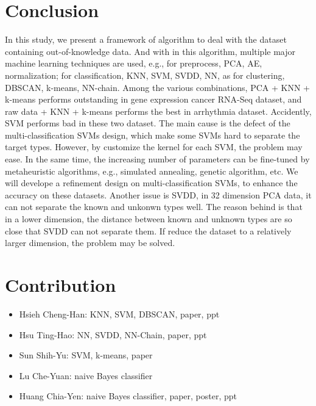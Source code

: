 \documentclass[twocolumn,10pt]{article}
\begin{document}
\section{Conclusion}
In this study, we present a framework of algorithm to deal with the dataset containing 
out-of-knowledge data. And with in this algorithm, multiple major machine learning 
techniques are used, e.g., for preprocess, PCA, AE, normalization; for classification, 
KNN, SVM, SVDD, NN, as for clustering, DBSCAN, k-means, NN-chain. Among the various 
combinations, PCA + KNN + k-means performs outstanding in gene expression cancer RNA-Seq 
dataset, and raw data + KNN + k-means performs the best in arrhythmia dataset. Accidently, 
SVM performs bad in these two dataset. The main cause is the defect of the multi-classification 
SVMs design, which make some SVMs hard to separate the target types. However, by customize 
the kernel for each SVM, the problem may ease. In the same time, the increasing number of 
parameters can be fine-tuned by metaheuristic algorithms, e.g., simulated annealing, genetic 
algorithm, etc. We will develope a refinement design on multi-classification SVMs, to enhance 
the accuracy on these datasets. Another issue is SVDD, in 32 dimension PCA data, it can not 
separate the known and unkonwn types well. The reason behind is that in a lower dimension, 
the distance between known and unknown types are so close that SVDD can not separate them. 
If reduce the dataset to a relatively larger dimension, the problem may be solved.

\section{Contribution}
\begin{itemize}
  \item Hsieh Cheng-Han: KNN, SVM, DBSCAN, paper, ppt
  \item Hsu Ting-Hao: NN, SVDD, NN-Chain, paper, ppt
  \item Sun Shih-Yu: SVM, k-means, paper
  \item Lu Che-Yuan: naive Bayes classifier
  \item Huang Chia-Yen: naive Bayes classifier, paper, poster, ppt
\end{itemize}



\end{document}
